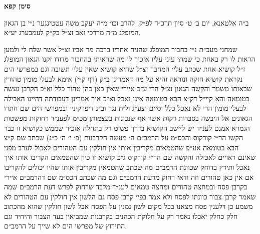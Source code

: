 \documentclass[12pt, openany]{book}
\newcommand{\chapname}{}
\newcommand{\newchap}[1]{
	\addcontentsline{toc}{chapter}{#1}
	\renewcommand{\chapname}{#1}
		\begin{center}
			\textbf{%
\fontsize{16pt}{16pt}\selectfont
				#1}
		\end{center}
}
\begin{document}
\newchap{סימן קפא}
\begin{multicols}{2}
ב״ה אלטאנא, יום ב׳ ט׳ סיון תרכ״ד לפ״ק. להרב וכו׳ מ״ה יעקב משה עטטינגער נ״י בן הגאון המופלג מ״ה מרדכי זאב זצ״ל בק״ק לעמבערג יע״א.\\\vspace{0pt}

שמחני מעכ״ת נ״י בחבור המופלג שהניח אחריו ברכה מר אביו זצ״ל אשר שלח לי ולמען הראות לו רק באחת כי שמתי עיני עליו אזכיר לו מה שראיתי בהחבור מדודו זקנו הגאון המופלג ז״ל קושיא אחת שכתב עלי׳ המחבר זצ״ל שהיא קושיא שאין עלי׳ תשובה וגם במפרשי הים נקראת קושיא חזקה ונוראה והיא על מה דאמרינן ב״ק (דף ק״י) אימא לבעלי מומין טהורין שבאותו משמר והקשה הגאון זצ״ל הרי ע״כ איירי שאין כאן כהן טהור כלל וא״כ הקרבן נעשה בטומאה והא קיי״ל דק״צ הבא בטומאה אינו נאכל וא״כ איך אמרינן דעבודתה דהיינו האכילה לבעלי מומין הרי לא נאכל כלל וסיים וצע״ג ולית נגר וב״נ דיפרקיני׳ ובמפרשי הים שם חתרו הגאונים אל היבשה בסברות דקות אשר אף שנכונות בעצמותן מכ״מ לפענ״ד רחוקות מפשטות הגמרא אמנם לענ״ד יש ליישב הקושיא בדרך פשוט רק בתחלה אזכיר שממש כקושיא זו כבר הקשו הר״י קורקוס והכס״מ על הרמב״ם ה׳ מעשה הקרבנות (פ׳ י׳ ה׳ כ״ג) שכתב שם ק״צ הבא בטומאה אע״פ שהטמאים מקריבין אותו אין חולקין עם הטהורים לאכול לערב מפני שאינם ראויים לאכילה והקשה שם הר״י קורקוס ג״כ קושיא זו כיון שהטמאים הקריבו אותו איך נאכל ותירץ בדוחק שכוונת הרמב״ם מה שכתב שהטמאין מקריבין אותו שהיו יכולים להקריבו אם אין כאן טהורים וזה ודאי רחוק מדעת הרמב״ם וגם מה שכתב הכס״מ שם דהרמב״ם איירי בקרבן פסח ובמחצה טהורים ומחצה טמאים לענ״ד מלבד שרחוק לפרש דעת הרמב״ם שמה שאמר קרבן צבור כוונתו לפסח ולא אמר בפי׳ קרבן פסח גם הלשון אין חולקין עם הטהורים לא משמע כן דלענין פסח מצאנו בכל מקום לשון נמנין על הפסח אבל לשון חולקין שהוא מהכתוב חלק כחלק יאכלו נאמר רק על חלוקת הכהנים בקרבנות שמביאין בעד הצבור והיחיד וגם התירוץ של מפרשי הים לא שייך על הרמב״ם.\\\vspace{0pt}


\end{multicols}
\end{document}

